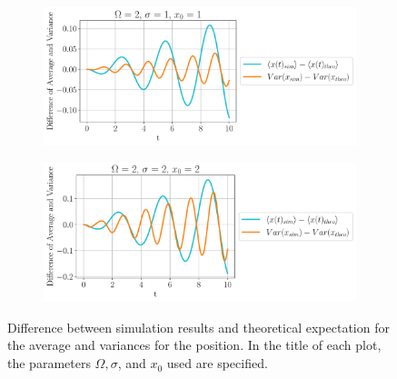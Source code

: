 \begin{figure}[h!]
\begin{subfigure}[h]{0.65\textwidth}
     \end{subfigure}
     \begin{subfigure}[h]{0.4\textwidth}
         \centering
         \includegraphics[width=\textwidth]{plot/Omega2_sigma1_x01_Averages_expect.pdf}
         \caption{}
     \end{subfigure}
     \begin{subfigure}[h]{0.65\textwidth}
         \centering
         \includegraphics[width=\textwidth]{plot/Omega2_sigma2_x02_Averages_expect.pdf}
         \caption{}
     \end{subfigure}
\caption{Difference between simulation results and theoretical expectation for the average and variances for the position. In the title of each plot, the parameters $\Omega, \sigma$, and $x_0$ used are specified.}
\label{fig: difference}
\end{figure}



